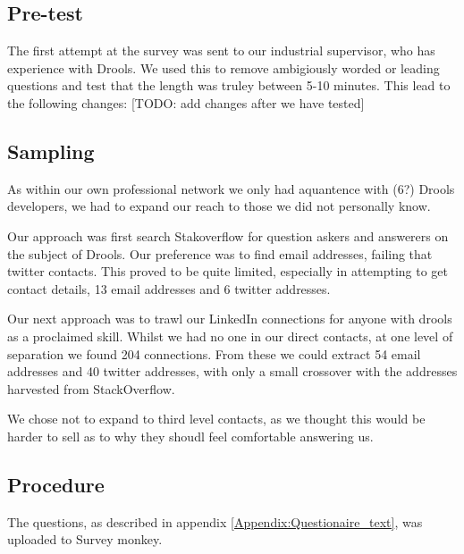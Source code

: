\subsection{Pre-test}
The first attempt at the survey was sent to our industrial supervisor, who has experience with Drools.
We used this to remove ambigiously worded or leading questions and test that the length was truley between 5-10 minutes.
This lead to the following changes:
[TODO: add changes after we have tested]


\subsection{Sampling}
As within our own professional network we only had aquantence with (6?) Drools developers, we had to expand our reach to those we did not personally know.

Our approach was first search Stakoverflow for question askers and answerers on the subject of Drools.
Our preference was to find email addresses, failing that twitter contacts.
This proved to be quite limited, especially in attempting to get contact details, 13 email addresses and 6 twitter addresses.

Our next approach was to trawl our LinkedIn connections for anyone with drools as a proclaimed skill.
Whilst we had no one in our direct contacts, at one level of separation we found 204 connections.
From these we could extract 54 email addresses and 40 twitter addresses, with only a small crossover with the addresses harvested from StackOverflow.

We chose not to expand to third level contacts, as we thought this would be harder to sell as to why they shoudl feel comfortable answering us.

\subsection{Procedure}

The questions, as described in appendix \ref{Appendix:Questionaire_text}, was uploaded to Survey monkey.

